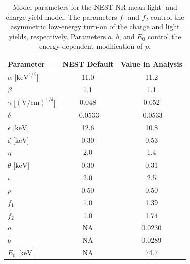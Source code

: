 \begin{table}[ht]
    \centering
    \caption{
        Model parameters for the NEST NR mean light- and charge-yield model.
        The parameters $f_1$ and $f_2$ control the asymmetric low-energy
        turn-on of the charge and light yields, respectively. Parameters $a$, $b$, and $E_0$ control the energy-dependent modification of $p$.
    }
    \begin{tabular}{lcc}
        \hline\hline
        Parameter & NEST Default & Value in Analysis \\
        \hline
        $\alpha$ [$\mathrm{keV}^{1/\beta}$] & 11.0 & 11.2 \\
        $\beta$ & 1.1 & 1.1 \\
        $\gamma$ [$(\mathrm{V/cm})^{1/\delta}$] & 0.048 & 0.052 \\
        $\delta$ & -0.0533 & -0.0533 \\
        $\epsilon$ [$\mathrm{keV}$] & 12.6 & 10.8 \\
        $\zeta$ [$\mathrm{keV}$] & 0.30 & 0.53 \\
        $\eta$ & 2.0 & 1.4 \\
        $\theta$ [$\mathrm{keV}$] & 0.30 & 0.31 \\
        $\iota$ & 2.0 & 2.5 \\
        $p$ & 0.50 & 0.50 \\
        \hline
        $f_1$ & 1.0 & 1.39 \\
        $f_2$ & 1.0 & 1.74 \\
                \hline
        $a$ & NA & 0.0230 \\
        $b$ & NA &  0.0289 \\
        $E_0$ [$\mathrm{keV}$] & NA & 74.7 \\
        \hline\hline
    \end{tabular}
    \label{tab:eft2024_nr_yield_parameters}
\end{table}
